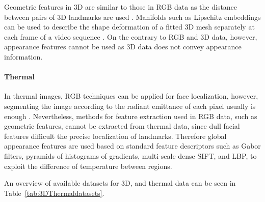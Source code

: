 Geometric features in 3D are similar to those in RGB data as the distance between pairs of 3D
landmarks are used \cite{Tang2008}. Manifolds such as Lipschitz embeddings can be used to describe the shape deformation of a fitted 3D mesh separately at each frame of a video sequence \cite{Chang2005automatic}. On the contrary to RGB and 3D data, however, appearance features cannot be used as 3D data does not convey appearance information.



\paragraph{Thermal}

In thermal images, RGB techniques can be applied for face localization, however, segmenting the image according to the radiant emittance of each pixel usually is enough \cite{Koda2009facial}.
Nevertheless, methods for feature extraction used in RGB data, such as geometric features,  cannot be extracted from thermal data, since
dull facial features difficult the precise localization of landmarks. Therefore global appearance features are used based on standard feature descriptors such as Gabor filters\cite{Littlewort2011}, pyramids
of histograms of gradients\cite{Dhall2011emotion}, multi-scale dense SIFT\cite{Sun2014combining}, and LBP\cite{Shan2009facial}, to exploit the difference of temperature between
regions.



An overview of available datasets for 3D, and thermal data can be seen in Table~\ref{tab:3DThermaldatasets}.


